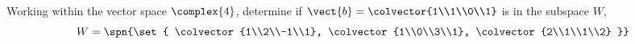 Working within the vector space $\complex{4}$, determine if 
$\vect{b} = \colvector{1\\1\\0\\1}$ 
is in the subspace $W$,
%
\begin{equation*}
W =\spn{\set{
\colvector{1\\2\\-1\\1}, 
\colvector{1\\0\\3\\1}, 
\colvector{2\\1\\1\\2}
}}
\end{equation*}
